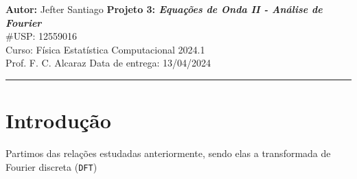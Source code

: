 \documentclass[a4paper, 11pt]{tufte-handout}
\begin{document}
\noindent
\large\textbf{Autor:} Jefter Santiago \hfill \textbf{Projeto 3: {\color{blue}\emph{Equações de Onda
      II - Análise de Fourier}}}   \\
\#USP: 12559016 \\
\normalsize Curso: Física Estatística Computacional \hfill 2024.1 \\
Prof. F. C. Alcaraz \hfill Data de entrega: 13/04/2024\\
\noindent\rule{7in}{2.8pt}

\section{Introdução}


Partimos das relações estudadas anteriormente, sendo elas a transformada de Fourier discreta (\verb|DFT|)
\end{document}
